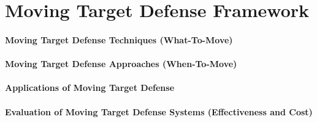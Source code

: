 \section{Moving Target Defense Framework}
\paragraph{Moving Target Defense Techniques (What-To-Move)}
\paragraph{Moving Target Defense Approaches (When-To-Move)}
\paragraph{Applications of Moving Target Defense}
\paragraph{Evaluation of Moving Target Defense Systems (Effectiveness and Cost)}